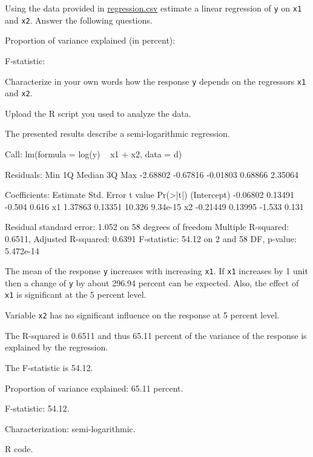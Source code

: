 
\begin{question}
Using the data provided in \url{regression.csv} estimate a linear regression of
\texttt{y} on \texttt{x1} and \texttt{x2}. Answer the following questions.

\begin{answerlist}
  \item Proportion of variance explained (in percent):
  \item F-statistic:
  \item Characterize in your own words how the response \texttt{y} depends on the regressors \texttt{x1} and \texttt{x2}.
  \item Upload the R script you used to analyze the data.
\end{answerlist}
\end{question}

\begin{solution}
The presented results describe a semi-logarithmic regression.

\begin{Schunk}
\begin{Soutput}
Call:
lm(formula = log(y) ~ x1 + x2, data = d)

Residuals:
     Min       1Q   Median       3Q      Max 
-2.68802 -0.67816 -0.01803  0.68866  2.35064 

Coefficients:
            Estimate Std. Error t value Pr(>|t|)
(Intercept) -0.06802    0.13491  -0.504    0.616
x1           1.37863    0.13351  10.326 9.34e-15
x2          -0.21449    0.13995  -1.533    0.131

Residual standard error: 1.052 on 58 degrees of freedom
Multiple R-squared:  0.6511,	Adjusted R-squared:  0.6391 
F-statistic: 54.12 on 2 and 58 DF,  p-value: 5.472e-14
\end{Soutput}
\end{Schunk}

The mean of the response \texttt{y} increases with increasing \texttt{x1}.
If \texttt{x1} increases by 1 unit then a change of \texttt{y} by about 296.94 percent can be expected.
Also, the effect of \texttt{x1} is  significant at the 5 percent level.

Variable \texttt{x2} has no significant influence on the response at 5 percent level.

The R-squared is 0.6511 and thus 65.11 percent of the
variance of the response is explained by the regression.

The F-statistic is 54.12.

\begin{answerlist}
  \item Proportion of variance explained: 65.11 percent.
  \item F-statistic: 54.12.
  \item Characterization: semi-logarithmic.
  \item R code.
\end{answerlist}
\end{solution}

